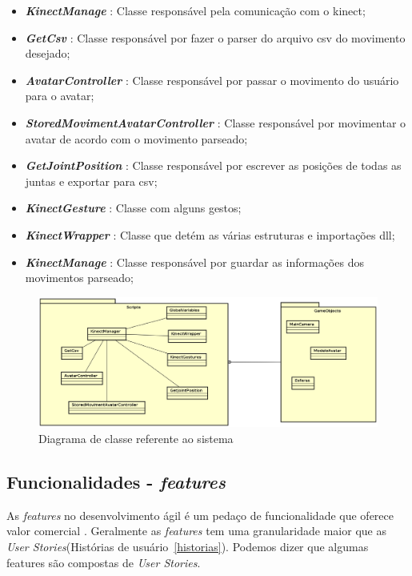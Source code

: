 \begin{itemize}
  \item \textit{\textbf{KinectManage}} : Classe responsável pela comunicação com o kinect;
  \item \textit{\textbf{GetCsv}} : Classe responsável por fazer o parser do arquivo csv do movimento desejado;
  \item \textit{\textbf{AvatarController}} : Classe responsável por passar o movimento do usuário para o avatar;
  \item \textit{\textbf{StoredMovimentAvatarController}} : Classe responsável por movimentar o avatar de acordo com o movimento parseado;
  \item \textit{\textbf{GetJointPosition}} : Classe responsável por escrever as posições de todas as juntas e exportar para csv;
  \item \textit{\textbf{KinectGesture}} : Classe com alguns gestos;
  \item \textit{\textbf{KinectWrapper}} : Classe que detém as várias estruturas e importações dll;
  \item \textit{\textbf{KinectManage}} : Classe responsável por guardar as informações dos movimentos parseado;
\end{itemize}


  \begin{figure}[!h]
  \centering
  \includegraphics [keepaspectratio=true,scale=0.45]{figuras/DiagramaDeClasse.eps}

  \caption{Diagrama de classe referente ao sistema}
  \label{diagramaClasse}
  \end{figure}


\subsection{Funcionalidades - \textit{features}}\label{sub:solFeatures}
  As \textit{features} no desenvolvimento ágil é um pedaço de funcionalidade que oferece valor comercial \cite{versionOne}.
Geralmente as \textit{features} tem uma granularidade maior que as \textit{User Stories}(Histórias de usuário~\ref{historias}).
Podemos dizer que algumas features são compostas de \textit{User Stories}.

